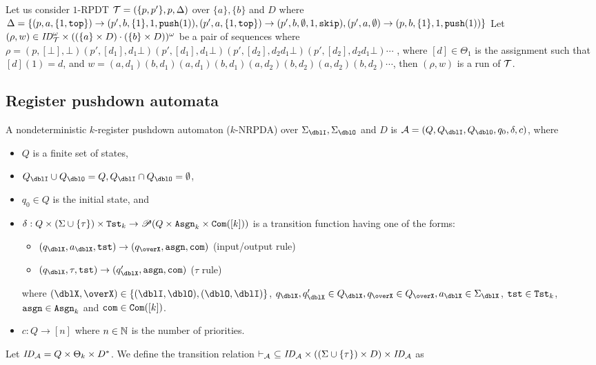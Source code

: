 \begin{example}
\label{ex: RPDT}
Let us consider $1$-RPDT
${\cal T} = (\{p,p'\},p,\Delta)$
over $\{a\},\{b\}$ and $D$ where
$\Delta = \{
(p, a, \{1,\mathtt{top}\}) \rightarrow (p', b, \{1\}, 1, \mathtt{push}(1)),
(p',a, \{1,\mathtt{top}\}) \rightarrow (p', b, \emptyset, 1, \mathtt{skip}),
(p',a, \emptyset) \rightarrow (p, b, \{1\}, 1, \mathtt{push}(1))
\}$
Let $(\rho,w)\in \mathit{ID}_{\cal T}^\omega\times ((\{a\}\times D)\cdot(\{b\}\times D))^\omega$
be a pair of sequences where
$\rho=(p,[\bot],\bot)(p',[d_1],d_1\bot)(p',[d_1],d_1\bot)(p',[d_2],d_2d_1\bot)(p',[d_2],d_2d_1\bot)\cdots$
, where $[d]\in\Theta_1$ is the assignment such that $[d](1)=d$,
and
$w=(a,d_1)(b,d_1)(a,d_1)(b,d_1)(a,d_2)(b,d_2)(a,d_2)(b,d_2)\cdots$,
then $(\rho,w)$ is a run of ${\cal T}$.
\end{example}

\subsection{Register pushdown automata}\label{sec:RA}
\begin{definition}
A nondeterministic $k$-register pushdown automaton ($k$-NRPDA) over $\Sigma_\dblI,\Sigma_\dblO$ and $D$ is $\calA=(Q, Q_\dblI, Q_\dblO, q_0, \delta, c)$, where
\begin{itemize}
\item $Q$ is a finite set of states,
\item $Q_\dblI\cup Q_\dblO = Q, Q_\dblI\cap Q_\dblO = \emptyset$,
\item $q_0\in Q$ is the initial state, and
\item $\delta: Q \times (\Sigma\cup\{\tau\})\times \mathtt{Tst}_k \to \mathscr{P}(Q \times\mathtt{Asgn}_k\times \mathtt{Com}([k]))$ is a transition function having one of the forms:
\begin{itemize}
\item $(q_\dblX,a_\dblX,\tst)\to(q_\overX,\asgn,\com)$ (input/output rule)
\item $(q_\dblX,\tau,\tst)\to(q'_\dblX,\asgn,\com)$ ($\tau$ rule)
\end{itemize}
where $(\dblX, \overX)\in\{(\dblI, \dblO), (\dblO,\dblI)\}$,
$q_\dblX, q'_\dblX\in Q_\dblX, q_\overX\in Q_\overX, a_\dblX\in \Sigma_\dblX$, $\mathtt{tst}\in\mathtt{Tst}_k$, $\mathtt{asgn}\in\mathtt{Asgn}_k$ and $\mathtt{com}\in\mathtt{Com}([k])$.
\item $c: Q \to [n]$ where $n\in \mathbb{N}$ is the number of priorities.
\end{itemize}
\end{definition}
\noindent
Let $\mathit{ID}_{\cal A}= Q\times \Theta_k\times D^*$.
We define the transition relation $\vdash_{\cal A}\ \subseteq\mathit{ID}_{\cal A}\times ((\Sigma\cup\{\tau\})\times D)\times \mathit{ID}_{\cal A}$ as

